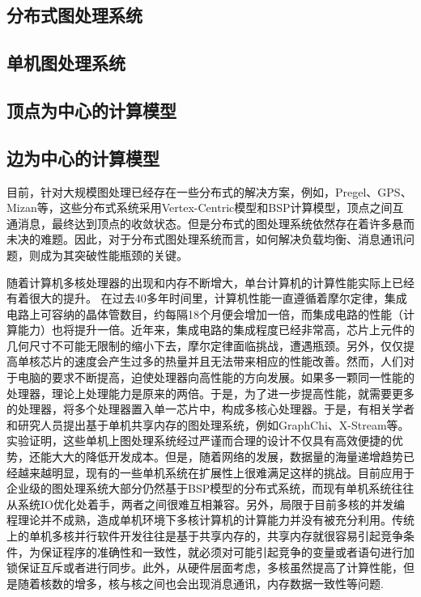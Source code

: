 \subsection{分布式图处理系统}
\subsection{单机图处理系统}

\subsection{顶点为中心的计算模型}
\subsection{边为中心的计算模型}



目前，针对大规模图处理已经存在一些分布式的解决方案，例如，Pregel、GPS、Mizan等，这些分布式系统采用Vertex-Centric模型和BSP计算模型，顶点之间互通消息，最终达到顶点的收敛状态。但是分布式的图处理系统依然存在着许多悬而未决的难题。因此，对于分布式图处理系统而言，如何解决负载均衡、消息通讯问题，则成为其突破性能瓶颈的关键。

随着计算机多核处理器的出现和内存不断增大，单台计算机的计算性能实际上已经有着很大的提升。
在过去40多年时间里，计算机性能一直遵循着摩尔定律，集成电路上可容纳的晶体管数目，约每隔18个月便会增加一倍，而集成电路的性能（计算能力）也将提升一倍。近年来，集成电路的集成程度已经非常高，芯片上元件的几何尺寸不可能无限制的缩小下去，摩尔定律面临挑战，遭遇瓶颈。另外，仅仅提高单核芯片的速度会产生过多的热量并且无法带来相应的性能改善。然而，人们对于电脑的要求不断提高，迫使处理器向高性能的方向发展。如果多一颗同一性能的处理器，理论上处理能力是原来的两倍。于是，为了进一步提高性能，就需要更多的处理器，将多个处理器置入单一芯片中，构成多核心处理器。于是，有相关学者和研究人员提出基于单机共享内存的图处理系统，例如GraphChi、X-Stream等。实验证明，这些单机上图处理系统经过严谨而合理的设计不仅具有高效便捷的优势，还能大大的降低开发成本。但是，随着网络的发展，数据量的海量递增趋势已经越来越明显，现有的一些单机系统在扩展性上很难满足这样的挑战。目前应用于企业级的图处理系统大部分仍然基于BSP模型的分布式系统，而现有单机系统往往从系统IO优化处着手，两者之间很难互相兼容。另外，局限于目前多核的并发编程理论并不成熟，造成单机环境下多核计算机的计算能力并没有被充分利用。传统上的单机多核并行软件开发往往是基于共享内存的，共享内存就很容易引起竞争条件，为保证程序的准确性和一致性，就必须对可能引起竞争的变量或者语句进行加锁保证互斥或者进行同步。此外，从硬件层面考虑，多核虽然提高了计算性能，但是随着核数的增多，核与核之间也会出现消息通讯，内存数据一致性等问题.

